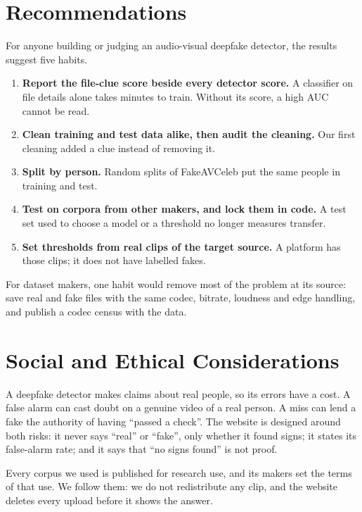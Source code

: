\section{Recommendations}

For anyone building or judging an audio-visual deepfake detector, the results
suggest five habits.

\begin{enumerate}
    \item \textbf{Report the file-clue score beside every detector score.} A
    classifier on file details alone takes minutes to train. Without its
    score, a high AUC cannot be read.
    \item \textbf{Clean training and test data alike, then audit the cleaning.}
    Our first cleaning added a clue instead of removing it.
    \item \textbf{Split by person.} Random splits of FakeAVCeleb put the same
    people in training and test.
    \item \textbf{Test on corpora from other makers, and lock them in code.} A
    test set used to choose a model or a threshold no longer measures transfer.
    \item \textbf{Set thresholds from real clips of the target source.} A
    platform has those clips; it does not have labelled fakes.
\end{enumerate}

For dataset makers, one habit would remove most of the problem at its source:
save real and fake files with the same codec, bitrate, loudness and edge
handling, and publish a codec census with the data.

\section{Social and Ethical Considerations}

A deepfake detector makes claims about real people, so its errors have a
cost. A false alarm can cast doubt on a genuine video of a real person. A miss
can lend a fake the authority of having ``passed a check''. The website is
designed around both risks: it never says ``real'' or ``fake'', only whether it
found signs; it states its false-alarm rate; and it says that ``no signs
found'' is not proof.

Every corpus we used is published for research use, and its makers set the
terms of that use. We follow them: we do not redistribute any clip, and the
website deletes every upload before it shows the answer.

